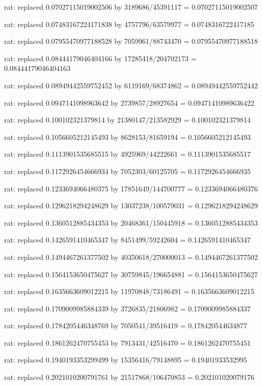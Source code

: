 \documentclass[a4paper,10pt]{article}
\begin{document}
\begin{eulernotebook}
\begin{eulercomment}
\begin{eulercomment}
\begin{eulercomment}
\begin{eulercomment}
\begin{eulercomment}
\begin{eulercomment}
\begin{eulercomment}
\begin{eulercomment}
\begin{eulercomment}
\begin{eulercomment}
\begin{eulercomment}
\begin{eulercomment}
\begin{eulercomment}
\begin{eulercomment}
\begin{eulercomment}
\begin{eulercomment}
\begin{euleroutput}
  rat: replaced 0.07027115019002506 by 3189686/45391117 = 0.07027115019002507
  
  rat: replaced 0.07483167224171838 by 4757796/63579977 = 0.0748316722417185
  
  rat: replaced 0.07955470977188528 by 7059961/88743470 = 0.07955470977188518
  
  rat: replaced 0.08444179046404166 by 17285418/204702173 = 0.08444179046404163
  
  rat: replaced 0.08949442559752452 by 6119169/68374862 = 0.08949442559752442
  
  rat: replaced 0.0947141098963642 by 2739857/28927654 = 0.09471410989636422
  
  rat: replaced 0.100102321379814 by 21380147/213582929 = 0.100102321379814
  
  rat: replaced 0.1056605212145493 by 8628153/81659194 = 0.1056605212145493
  
  rat: replaced 0.1113901535685515 by 4925969/44222661 = 0.1113901535685517
  
  rat: replaced 0.1172926454666934 by 7052303/60125705 = 0.1172926454666935
  
  rat: replaced 0.1233694066480375 by 17851649/144700777 = 0.1233694066480376
  
  rat: replaced 0.1296218294248629 by 13037238/100579031 = 0.1296218294248629
  
  rat: replaced 0.1360512885434353 by 20468361/150445918 = 0.1360512885434353
  
  rat: replaced 0.1426591410465347 by 8451499/59242604 = 0.1426591410465347
  
  rat: replaced 0.1494467261377502 by 40350618/270000013 = 0.1494467261377502
  
  rat: replaced 0.1564153650475627 by 30759845/196654881 = 0.1564153650475627
  
  rat: replaced 0.1635663609012215 by 11970848/73186491 = 0.1635663609012215
  
  rat: replaced 0.1709009985884339 by 3726835/21806982 = 0.1709009985884337
  
  rat: replaced 0.1784205446348769 by 7050541/39516419 = 0.178420544634877
  
  rat: replaced 0.1861262470755453 by 7913431/42516470 = 0.1861262470755451
  
  rat: replaced 0.1940193353299499 by 15356416/79148895 = 0.19401933532995
  
  rat: replaced 0.2021010200791761 by 21517868/106470853 = 0.202101020079176
  

\end{euleroutput}
\end{eulercomment}
\end{eulercomment}
\end{eulercomment}
\end{eulercomment}
\end{eulercomment}
\end{eulercomment}
\end{eulercomment}
\end{eulercomment}
\end{eulercomment}
\end{eulercomment}
\end{eulercomment}
\end{eulercomment}
\end{eulercomment}
\end{eulercomment}
\end{eulercomment}
\end{eulercomment}
\end{eulernotebook}
\end{document}
